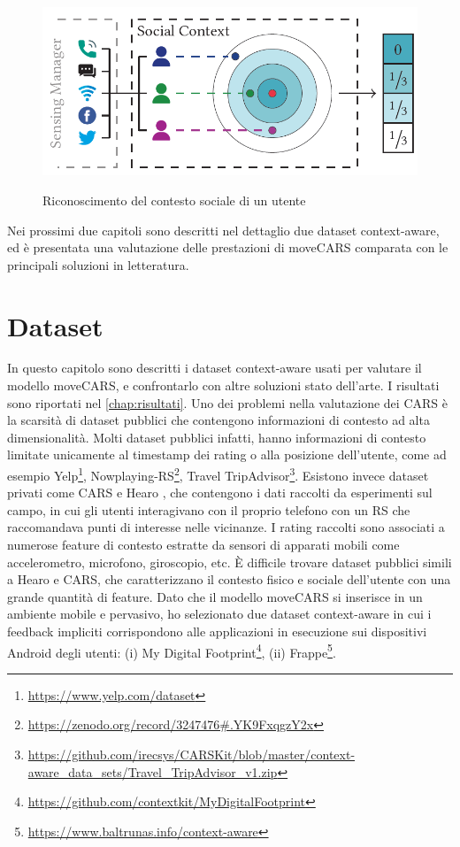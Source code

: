 \documentclass[12pt,italian]{report}
\begin{document}
\begin{figure}
  \centering
  \includegraphics[scale=0.80]{immagini/ego-array.png}
  \caption{Riconoscimento del contesto sociale di un utente}
  \label{fig:ego-array}	
  \cite{ego-net}
\end{figure}

Nei prossimi due capitoli sono descritti nel dettaglio due dataset context-aware, ed è presentata una valutazione delle prestazioni di moveCARS comparata con le principali soluzioni in letteratura.

% 
% 
\chapter{Dataset} \label{chap:datasets}
In questo capitolo sono descritti i dataset context-aware usati per valutare il modello moveCARS, e confrontarlo con altre soluzioni stato dell'arte. I risultati sono riportati nel \autoref{chap:risultati}. Uno dei problemi nella valutazione dei CARS è la scarsità di dataset pubblici che contengono informazioni di contesto ad alta dimensionalità. Molti dataset pubblici infatti, hanno informazioni di contesto limitate unicamente al timestamp dei rating o alla posizione dell'utente, come ad esempio Yelp\footnote{\url{https://www.yelp.com/dataset}}, Nowplaying-RS\footnote{\url{https://zenodo.org/record/3247476\#.YK9FxqgzY2x}}, Travel TripAdvisor\footnote{\url{https://github.com/irecsys/CARSKit/blob/master/context-aware_data_sets/Travel_TripAdvisor_v1.zip}}. Esistono invece dataset privati come CARS \cite{context-aware-deep-learning} e Hearo \cite{latent-context}, che contengono i dati raccolti da esperimenti sul campo, in cui gli utenti interagivano con il proprio telefono con un RS che raccomandava punti di interesse nelle vicinanze. I rating raccolti sono associati a numerose feature di contesto estratte da sensori di apparati mobili come accelerometro, microfono, giroscopio, etc.
\`E difficile trovare dataset pubblici simili a Hearo e CARS, che caratterizzano il contesto fisico e sociale dell'utente con una grande quantità di feature. Dato che il modello moveCARS si inserisce in un ambiente mobile e pervasivo, ho selezionato due dataset context-aware in cui i feedback impliciti corrispondono alle applicazioni in esecuzione sui dispositivi Android degli utenti: (i) My Digital Footprint\footnote{\url{https://github.com/contextkit/MyDigitalFootprint}}, (ii) Frappe\footnote{\url{https://www.baltrunas.info/context-aware}}.
\end{document}
